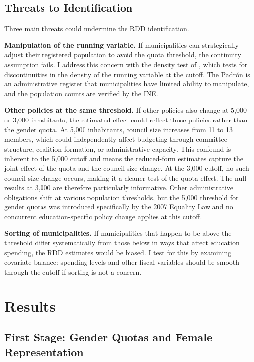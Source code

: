 \documentclass[12pt]{article}
\begin{document}
\subsection{Threats to Identification}

Three main threats could undermine the RDD identification.

\textbf{Manipulation of the running variable.} If municipalities can strategically adjust their registered population to avoid the quota threshold, the continuity assumption fails. I address this concern with the density test of \citet{cattaneo2020simple}, which tests for discontinuities in the density of the running variable at the cutoff. The Padr\'{o}n is an administrative register that municipalities have limited ability to manipulate, and the population counts are verified by the INE.

\textbf{Other policies at the same threshold.} If other policies also change at 5,000 or 3,000 inhabitants, the estimated effect could reflect those policies rather than the gender quota. At 5,000 inhabitants, council size increases from 11 to 13 members, which could independently affect budgeting through committee structure, coalition formation, or administrative capacity. This confound is inherent to the 5,000 cutoff and means the reduced-form estimates capture the joint effect of the quota and the council size change. At the 3,000 cutoff, no such council size change occurs, making it a cleaner test of the quota effect. The null results at 3,000 are therefore particularly informative. Other administrative obligations shift at various population thresholds, but the 5,000 threshold for gender quotas was introduced specifically by the 2007 Equality Law and no concurrent education-specific policy change applies at this cutoff.

\textbf{Sorting of municipalities.} If municipalities that happen to be above the threshold differ systematically from those below in ways that affect education spending, the RDD estimates would be biased. I test for this by examining covariate balance: spending levels and other fiscal variables should be smooth through the cutoff if sorting is not a concern.


\section{Results}

\subsection{First Stage: Gender Quotas and Female Representation}
\label{sec:first_stage}
\end{document}
